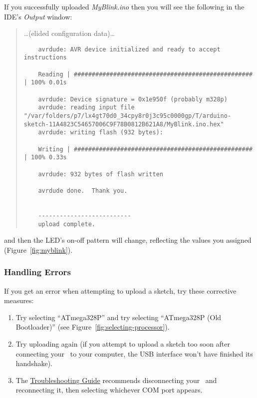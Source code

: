     If you successfully uploaded \textit{MyBlink.ino} then you will see the following in the IDE's \textit{Output} window:
    \begin{quote}
    \dots (elided configuration data)\dots
    \begin{verbatim}
    avrdude: AVR device initialized and ready to accept instructions

    Reading | ################################################## | 100% 0.01s

    avrdude: Device signature = 0x1e950f (probably m328p)
    avrdude: reading input file "/var/folders/p7/lx4gt70d0_34cpy8r0j3c95c0000gp/T/arduino-sketch-11A4823C54657006C9F78B0812B621A8/MyBlink.ino.hex"
    avrdude: writing flash (932 bytes):

    Writing | ################################################## | 100% 0.33s

    avrdude: 932 bytes of flash written

    avrdude done.  Thank you.


    --------------------------
    upload complete.
    \end{verbatim}\end{quote}
    and then the LED's on-off pattern will change, reflecting the  values you assigned (Figure~\ref{fig:myblink}).

    \subsubsection*{Handling Errors}

        If you get an error when attempting to upload a sketch, try these corrective measures:

        \begin{enumerate}
            \item Try selecting ``ATmega328P'' and try selecting ``ATmega328P (Old Bootloader)'' (see Figure~\ref{fig:selecting-processor}).
            \item Try uploading again (if you attempt to upload a sketch too soon after connecting your \developmentboard\ to your computer, the USB interface won't have finished its handshake).
            \item The \href{https://support.arduino.cc/hc/en-us/articles/4401874331410--Error-avrdude-when-uploading}{Troubleshooting Guide} recommends disconnecting your \developmentboard\ and reconnecting it, then selecting whichever COM port appears.
        \end{enumerate}

